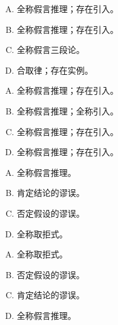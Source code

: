 {{        %
        \begin{practices}
            \begin{enumerate}[A.]
                \item 全称假言推理；存在引入。
                \item 全称假言推理；存在引入。
                \item 全称假言三段论。
                \item 合取律；存在实例。
            \end{enumerate}
        \end{practices}

        \begin{practices}
            \begin{enumerate}[A.]
                \item 全称假言推理；存在引入。
                \item 全称假言推理；全称引入。
                \item 全称假言推理；存在引入。
                \item 全称假言推理；存在引入。
            \end{enumerate}
        \end{practices}

        \begin{practices}
            \begin{enumerate}[A.]
                \item 全称假言推理。
                \item 肯定结论的谬误。
                \item 否定假设的谬误。
                \item 全称取拒式。
            \end{enumerate}
        \end{practices}

        \begin{practices}
            \begin{enumerate}[A.]
                \item 全称取拒式。
                \item 否定假设的谬误。
                \item 肯定结论的谬误。
                \item 全称假言推理。
            \end{enumerate}
        \end{practices}

}}
